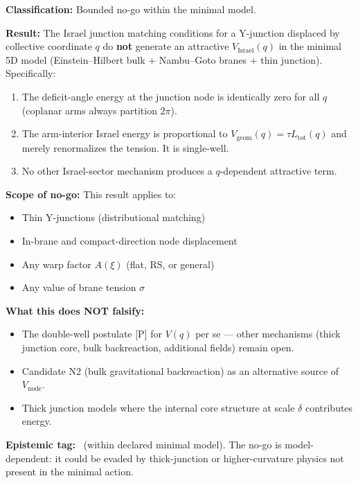 \begin{resultbox}[title=Phase 2 WP2 Outcome: Bounded No-Go]
\textbf{Classification:} Bounded no-go within the minimal model.

\textbf{Result:} The Israel junction matching conditions for a
Y-junction displaced by collective coordinate $q$ do \textbf{not}
generate an attractive $V_{\mathrm{Israel}}(q)$ in the minimal 5D
model (Einstein--Hilbert bulk + Nambu--Goto branes + thin junction).
Specifically:
\begin{enumerate}
    \item The deficit-angle energy at the junction node is identically
          zero for all $q$ (coplanar arms always partition $2\pi$).
    \item The arm-interior Israel energy is proportional to
          $V_{\mathrm{geom}}(q) = \tau L_{\mathrm{tot}}(q)$ and
          merely renormalizes the tension. It is single-well.
    \item No other Israel-sector mechanism produces a
          $q$-dependent attractive term.
\end{enumerate}

\textbf{Scope of no-go:} This result applies to:
\begin{itemize}
    \item Thin Y-junctions (distributional matching)
    \item In-brane and compact-direction node displacement
    \item Any warp factor $A(\xi)$ (flat, RS, or general)
    \item Any value of brane tension $\sigma$
\end{itemize}

\textbf{What this does NOT falsify:}
\begin{itemize}
    \item The double-well postulate [P] for $V(q)$ per se --- other
          mechanisms (thick junction core, bulk backreaction, additional
          fields) remain open.
    \item Candidate N2 (bulk gravitational backreaction) as an
          alternative source of $V_{\mathrm{node}}$.
    \item Thick junction models where the internal core structure
          at scale $\delta$ contributes energy.
\end{itemize}

\textbf{Epistemic tag:} \tagDc\ (within declared minimal model).
The no-go is model-dependent: it could be evaded by thick-junction
or higher-curvature physics not present in the minimal action.
\end{resultbox}

